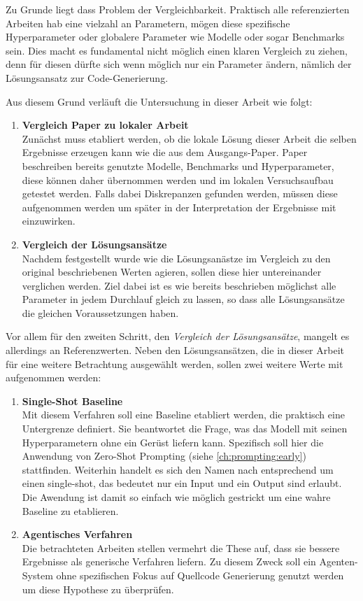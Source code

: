 Zu Grunde liegt dass Problem der Vergleichbarkeit. Praktisch alle referenzierten Arbeiten hab eine vielzahl an Parametern, mögen diese spezifische Hyperparameter oder globalere Parameter wie Modelle oder sogar Benchmarks sein. Dies macht es fundamental nicht möglich einen klaren Vergleich zu ziehen, denn für diesen dürfte sich wenn möglich nur ein Parameter ändern, nämlich der Lösungsansatz zur Code-Generierung.

Aus diesem Grund verläuft die Untersuchung in dieser Arbeit wie folgt:

\begin{enumerate}
    \item \textbf{Vergleich Paper zu lokaler Arbeit} \\ Zunächst muss etabliert werden, ob die lokale Lösung dieser Arbeit die selben Ergebnisse erzeugen kann wie die aus dem Ausgangs-Paper. Paper beschreiben bereits genutzte Modelle, Benchmarks und Hyperparameter, diese können daher übernommen werden und im lokalen Versuchsaufbau getestet werden. Falls dabei Diskrepanzen gefunden werden, müssen diese aufgenommen werden um später in der Interpretation der Ergebnisse mit einzuwirken.
    \item \textbf{Vergleich der Lösungsansätze} \\ Nachdem festgestellt wurde wie die Lösungsanästze im Vergleich zu den original beschriebenen Werten agieren, sollen diese hier untereinander verglichen werden. Ziel dabei ist es wie bereits beschrieben möglichst alle Parameter in jedem Durchlauf gleich zu lassen, so dass alle Lösungsansätze die gleichen Voraussetzungen haben.
\end{enumerate}

Vor allem für den zweiten Schritt, den \textit{Vergleich der Lösungsansätze}, mangelt es allerdings an Referenzwerten. Neben den Lösungsansätzen, die in dieser Arbeit für eine weitere Betrachtung ausgewählt werden, sollen zwei weitere Werte mit aufgenommen werden:

\begin{enumerate}
    \item \textbf{Single-Shot Baseline} \\ Mit diesem Verfahren soll eine Baseline etabliert werden, die praktisch eine Untergrenze definiert. Sie beantwortet die Frage, was das Modell mit seinen Hyperparametern ohne ein Gerüst liefern kann. Spezifisch soll hier die Anwendung von Zero-Shot Prompting (siehe \ref{ch:prompting:early}) stattfinden. Weiterhin handelt es sich den Namen nach entsprechend um einen single-shot, das bedeutet nur ein Input und ein Output sind erlaubt. Die Awendung ist damit so einfach wie möglich gestrickt um eine wahre Baseline zu etablieren.
    \item \textbf{Agentisches Verfahren} \\ Die betrachteten Arbeiten stellen vermehrt die These auf, dass sie bessere Ergebnisse als generische Verfahren liefern. Zu diesem Zweck soll ein Agenten-System ohne spezifischen Fokus auf Quellcode Generierung genutzt werden um diese Hypothese zu überprüfen.
\end{enumerate}

